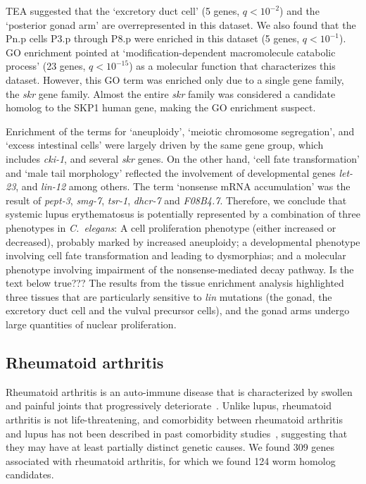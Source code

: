 \documentclass[10pt, onecolumn]{article}
\newcommand{\cel}{\emph{C.~elegans}}
\newcommand{\harthritis}{309}
\newcommand{\warthritis}{124}
\newcommand{\qval}[1]{\ensuremath{q<10^{-#1}}}
\begin{document}
TEA suggested that the `excretory duct cell' (5 genes, \qval{2}) and the
`posterior gonad arm' are overrepresented in this dataset. We also found that
the Pn.p cells P3.p through P8.p were enriched in this dataset (5 genes,
\qval{1}). GO enrichment pointed at `modification-dependent macromolecule
catabolic process' (23 genes, \qval{15}) as a molecular function that
characterizes this dataset. However, this GO term was enriched only due to a
single gene family, the \emph{skr} gene family. Almost the entire \emph{skr}
family was considered a candidate homolog to the SKP1 human gene, making the GO
enrichment suspect.

Enrichment of the terms for `aneuploidy', `meiotic chromosome segregation', and
`excess intestinal cells' were largely driven by the same gene group, which
includes \emph{cki-1}, and several \emph{skr} genes. On the other hand, `cell
fate transformation' and `male tail morphology' reflected the involvement of
developmental genes \emph{let-23}, and \emph{lin-12} among others. The term
`nonsense mRNA accumulation' was the result of \emph{pept-3}, \emph{smg-7},
\emph{tsr-1}, \emph{dhcr-7} and \emph{F08B4.7}. Therefore, we conclude that
systemic lupus erythematosus is potentially represented by a combination of
three phenotypes in \cel{}: A cell proliferation phenotype (either increased or
decreased), probably marked by increased aneuploidy; a developmental phenotype
involving cell fate transformation and leading to dysmorphias; and a molecular
phenotype involving impairment of the nonsense-mediated decay pathway. %
Is the text below true??? The results from the tissue enrichment analysis
highlighted three tissues that are particularly sensitive to \emph{lin}
mutations (the gonad, the excretory duct cell and the vulval precursor cells),
and the gonad arms undergo large quantities of nuclear proliferation.

\subsection*{Rheumatoid arthritis}
Rheumatoid arthritis is an auto-immune disease that is characterized by swollen
and painful joints that progressively deteriorate~\cite{Smolen2016}. Unlike
lupus, rheumatoid arthritis is not life-threatening, and comorbidity between
rheumatoid arthritis and lupus has not been described in past comorbidity
studies~\cite{Dougados2013}, suggesting that they may have at least partially
distinct genetic causes. We found \harthritis{} genes associated with rheumatoid
arthritis, for which we found \warthritis{} worm homolog candidates.
\end{document}
